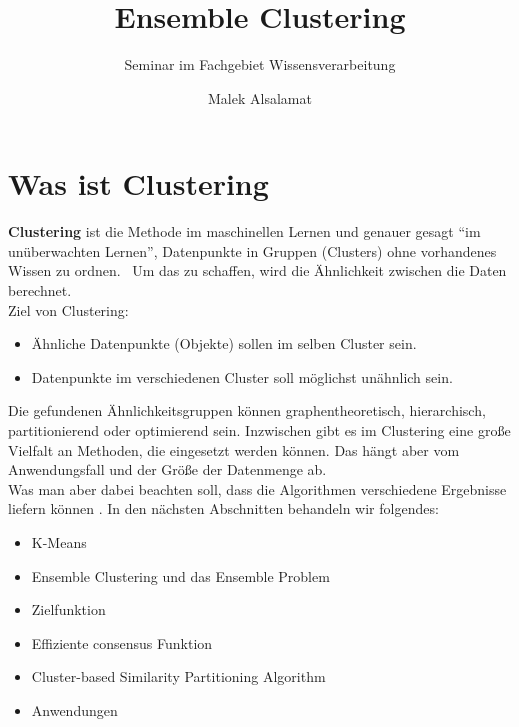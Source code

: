 \documentclass[runningheads]{llncs}
\title{Ensemble Clustering}
\subtitle{Seminar im Fachgebiet Wissensverarbeitung}
\author{Malek Alsalamat}
\institute{Universität Kassel}
\begin{document}
\maketitle	


  
\section{Was ist Clustering}
\textbf{Clustering} ist die Methode im maschinellen Lernen und genauer gesagt “im unüberwachten Lernen”, Datenpunkte in Gruppen (Clusters) ohne vorhandenes Wissen zu ordnen.  Um das zu schaffen, wird die Ähnlichkeit zwischen die Daten berechnet.\\[4pt]
Ziel von Clustering: 
\begin{itemize}
	\item Ähnliche Datenpunkte (Objekte) sollen im selben Cluster sein. 
	\item Datenpunkte im verschiedenen Cluster soll möglichst unähnlich sein.   
\end{itemize}
Die gefundenen Ähnlichkeitsgruppen können graphentheoretisch, hierarchisch, partitionierend oder optimierend sein. Inzwischen gibt es im Clustering eine große Vielfalt an Methoden, die eingesetzt werden können. Das hängt aber vom Anwendungsfall und der Größe der Datenmenge ab.\\[4pt]
Was man aber dabei beachten soll, dass die Algorithmen verschiedene Ergebnisse liefern können \cite{onlinequelle1}. In den nächsten Abschnitten behandeln wir folgendes:
\begin{itemize}
	\item K-Means 
	\item Ensemble Clustering und das Ensemble Problem
	\item Zielfunktion
	\item Effiziente consensus Funktion
	\item Cluster-based Similarity Partitioning Algorithm
	\item Anwendungen
\end{itemize}
\end{document}
